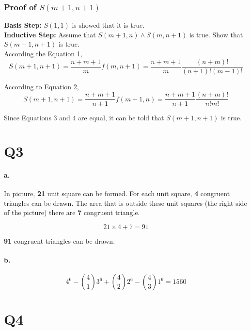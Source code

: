 \documentclass[11pt]{article}
\begin{document}
\subsubsection*{Proof of $S(m+1, n+1)$}

\textbf{Basis Step:} $S(1, 1)$ is showed that it is true.\\
\textbf{Inductive Step:} Assume that $S(m+1, n) \land S(m, n+1)$ is true. Show that $S(m+1, n+1)$ is true.\\

According the Equation 1, 
\begin{equation}
    S(m + 1, n + 1) = \frac{n+m+1}{m} f(m, n+1) = \frac{n+m+1}{m} \frac{(n+m)!}{(n+1)! (m-1)!}
\end{equation}

According to Equation 2,
\begin{equation}
    S(m + 1, n + 1) = \frac{n+m+1}{n+1} f(m+1, n) = \frac{n+m+1}{n+1} \frac{(n+m)!}{n! m!}
\end{equation}

Since Equations 3 and 4 are equal, it can be told that $S(m+1, n+1)$ is true.


\newpage
\section*{Q3}
\paragraph{\textbf{a.}}

In picture, \textbf{21} unit square can be formed. For each unit square, \textbf{4} congruent triangles can be drawn. The area that is outside these unit squares (the right side of the picture) there are \textbf{7} congruent triangle.

\begin{equation*}
    21 \times 4 + 7 = 91
\end{equation*}

\textbf{91} congruent triangles can be drawn.

\paragraph{\textbf{b.}}

\begin{equation*}
    4^6 - \binom{4}{1} 3^6 + \binom{4}{2} 2^6 - \binom{4}{3} 1^6 = 1560
\end{equation*}


\section*{Q4}
\end{document}
